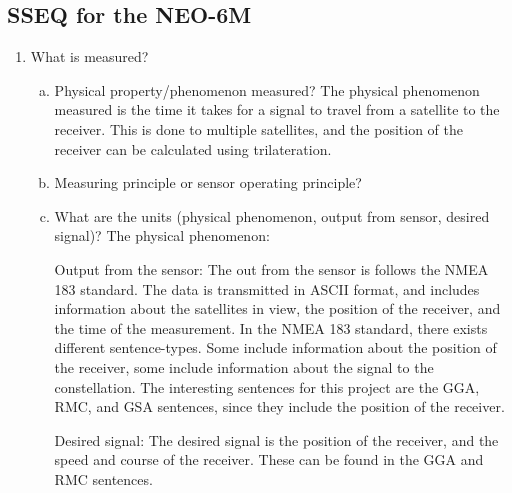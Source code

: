 \subsection{SSEQ for the NEO-6M}
\begin{enumerate}
    \item What is measured?
        \begin{enumerate}[(a)]
            \item Physical property/phenomenon measured?
            The physical phenomenon measured is the time it takes for a signal to travel from a satellite to the receiver.
            This is done to multiple satellites, and the position of the receiver can be calculated using trilateration.

            \item Measuring principle or sensor operating principle?
            \item What are the units (physical phenomenon, output from sensor, desired signal)?
            The physical phenomenon:

            Output from the sensor:
            The out from the sensor is follows the NMEA 183 standard. The data is transmitted in ASCII format, and includes information about the satellites in view, the position of the receiver, and the time of the measurement.
            In the NMEA 183 standard, there exists different sentence-types. Some include information about the position of the receiver, some include information about the signal to the constellation.
            The interesting sentences for this project are the GGA, RMC, and GSA sentences, since they include the position of the receiver. %


            Desired signal:
            The desired signal is the position of the receiver, and the speed and course of the receiver.
            These can be found in the GGA and RMC sentences.%


\end{enumerate}
\end{enumerate}
